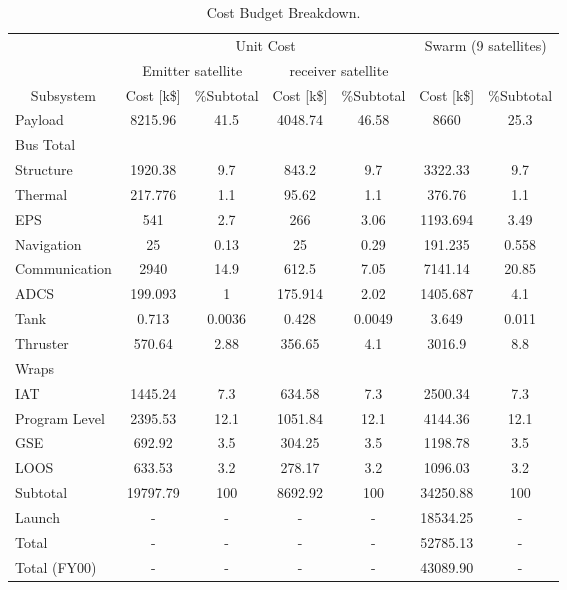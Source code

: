 \begin{table}[ht!]
\centering
\begin{tabular}{l|c|c|c|c|c|c|}
\cline{2-7}
  & \multicolumn{4}{|c|}{Unit Cost} & \multicolumn{2}{|c|}{\multirow{2}{*}{Swarm (9 satellites)}} \\\cline{2-5}
  
  & \multicolumn{2}{|c|}{Emitter satellite} & \multicolumn{2}{|c|}{receiver satellite} & \multicolumn{2}{|c|}{ } \\\hline
  
 \multicolumn{1}{|c|}{Subsystem} & Cost [k\$] & \%Subtotal & Cost [k\$] & \%Subtotal & Cost [k\$] & \%Subtotal \\\hline
 \multicolumn{1}{|l|}{Payload}       & 8215.96 & 41.5 & 4048.74 & 46.58 & 8660 & 25.3 \\\hline
 \multicolumn{7}{|l|}{Bus Total}     \\\hline
 \multicolumn{1}{|l|}{Structure}     & 1920.38 & 9.7 & 843.2 & 9.7 & 3322.33 & 9.7 \\\hline
 \multicolumn{1}{|l|}{Thermal}       & 217.776 & 1.1 & 95.62 & 1.1 & 376.76 & 1.1 \\\hline
 \multicolumn{1}{|l|}{EPS}           & 541 & 2.7 & 266 & 3.06 & 1193.694 & 3.49 \\\hline
 \multicolumn{1}{|l|}{Navigation}    & 25   & 0.13 & 25 & 0.29 & 191.235 & 0.558 \\\hline
 \multicolumn{1}{|l|}{Communication} & 2940 & 14.9 & 612.5 & 7.05 & 7141.14 & 20.85 \\\hline
 \multicolumn{1}{|l|}{\acs{ADCS}}    & 199.093 & 1 & 175.914 & 2.02 & 1405.687 & 4.1 \\\hline
 \multicolumn{1}{|l|}{Tank}          & 0.713 & 0.0036 & 0.428 & 0.0049 & 3.649 & 0.011 \\\hline
 \multicolumn{1}{|l|}{Thruster}      & 570.64  & 2.88 & 356.65  & 4.1 & 3016.9 & 8.8 \\\hline
 \multicolumn{7}{|l|}{Wraps}     \\\hline
 \multicolumn{1}{|l|}{\acs{IAT}}     & 1445.24 & 7.3 & 634.58 & 7.3 & 2500.34 & 7.3 \\\hline
 \multicolumn{1}{|l|}{Program Level} & 2395.53 & 12.1 & 1051.84 & 12.1 & 4144.36 & 12.1 \\\hline
 \multicolumn{1}{|l|}{\acs{GSE}}     & 692.92 & 3.5 & 304.25 & 3.5 & 1198.78 & 3.5 \\\hline
 \multicolumn{1}{|l|}{\acs{LOOS}}    & 633.53 & 3.2 & 278.17 & 3.2 & 1096.03 & 3.2 \\\hline
 \multicolumn{1}{|l|}{Subtotal}      & 19797.79 & 100 & 8692.92 & 100 & 34250.88 & 100 \\\hline
 \multicolumn{1}{|l|}{Launch}        & - & - & - & - & 18534.25 & - \\\hline\hline\hline
 \multicolumn{1}{|l|}{Total}         & - & - & - & - & 52785.13 & - \\\hline
 \multicolumn{1}{|l|}{Total (FY00)}  & - & - & - & - & 43089.90 & - \\\hline
 
\end{tabular}
\caption{Cost Budget Breakdown.}
\label{tab:CB}
\end{table}